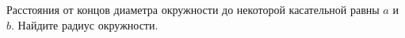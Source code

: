 \begin{ex}
	\begin{condition}
		Расстояния от концов диаметра окружности до некоторой касательной равны \( a  \) и \( b \). Найдите радиус окружности.
	\end{condition}
\end{ex}